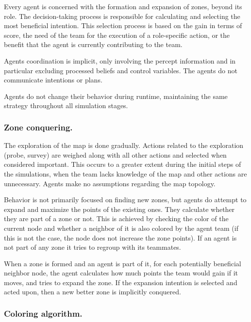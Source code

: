 \documentclass{llncs2e/llncs}
\begin{document}
    Every agent is concerned with the formation and expansion of zones, beyond
    its role.  The decision-taking process is responsible for calculating and
    selecting the most beneficial intention. This selection process is based on
    the gain in terms of score, the need of the team for the execution of
    a role-specific action, or the benefit that the agent is currently
    contributing to the team. 
    
    Agents coordination is implicit, only involving the percept information and
    in particular excluding processed beliefs and control variables. The agents
    do not communicate intentions or plans.

    Agents do not change their behavior during runtime, maintaining the same
    strategy throughout all simulation stages. 

\subsubsection{Zone conquering.}
    
    The exploration of the map is done gradually. Actions related to the
    exploration (probe, survey) are weighed along with all other actions and
    selected when considered important.  This occurs to a greater extent during
    the initial steps of the simulations, when the team lacks knowledge of the
    map and other actions are unnecessary. Agents make no assumptions regarding
    the map topology.

    Behavior is not primarily focused on finding new zones, but agents do
    attempt to expand and maximize the points of the existing ones.    They
    calculate whether they are part of a zone or not. This is achieved by
    checking the color of the current node and whether a neighbor of it is also
    colored by the agent team (if this is not the case, the node does not
    increase the zone points).  If an agent is not part of any zone it tries to
    regroup with its teammates. 

    When a zone is formed and an agent is part of it, for each potentially
    beneficial neighbor node, the agent calculates how much points the team
    would gain if it moves, and tries to expand the zone.  If the expansion
    intention is selected and acted upon, then a new better zone is implicitly
    conquered.
    
\subsubsection{Coloring algorithm.}    
    
\end{document}
